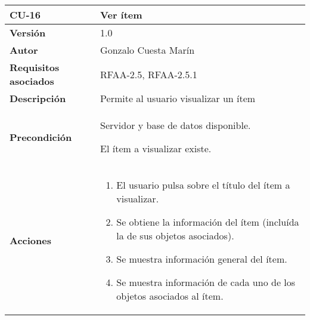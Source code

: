 \begin{longtable}[]{@{}ll@{}}
\toprule
\begin{minipage}[b]{0.24\columnwidth}\raggedright
\textbf{CU-16}\strut
\end{minipage} & \begin{minipage}[b]{0.70\columnwidth}\raggedright
\textbf{Ver ítem}\strut
\end{minipage}\tabularnewline
\midrule
\endhead
\begin{minipage}[t]{0.24\columnwidth}\raggedright
\textbf{Versión}\strut
\end{minipage} & \begin{minipage}[t]{0.70\columnwidth}\raggedright
1.0\strut
\end{minipage}\tabularnewline
\begin{minipage}[t]{0.24\columnwidth}\raggedright
\textbf{Autor}\strut
\end{minipage} & \begin{minipage}[t]{0.70\columnwidth}\raggedright
Gonzalo Cuesta Marín\strut
\end{minipage}\tabularnewline
\begin{minipage}[t]{0.24\columnwidth}\raggedright
\textbf{Requisitos asociados}\strut
\end{minipage} & \begin{minipage}[t]{0.70\columnwidth}\raggedright
RFAA-2.5, RFAA-2.5.1\strut
\end{minipage}\tabularnewline
\begin{minipage}[t]{0.24\columnwidth}\raggedright
\textbf{Descripción}\strut
\end{minipage} & \begin{minipage}[t]{0.70\columnwidth}\raggedright
Permite al usuario visualizar un ítem\strut
\end{minipage}\tabularnewline
\begin{minipage}[t]{0.24\columnwidth}\raggedright
\textbf{Precondición}\strut
\end{minipage} & \begin{minipage}[t]{0.70\columnwidth}\raggedright
Servidor y base de datos disponible.

El ítem a visualizar existe.\strut
\end{minipage}\tabularnewline
\begin{minipage}[t]{0.24\columnwidth}\raggedright
\textbf{Acciones}\strut
\end{minipage} & \begin{minipage}[t]{0.70\columnwidth}\raggedright
\begin{enumerate}
\def\labelenumi{\arabic{enumi}.}
\tightlist
\item
  El usuario pulsa sobre el título del ítem a visualizar.
\item
  Se obtiene la información del ítem (incluída la de sus objetos
  asociados).
\item
  Se muestra información general del ítem.
\item
  Se muestra información de cada uno de los objetos asociados al ítem.


\end{enumerate}
\end{minipage}
\end{longtable}
